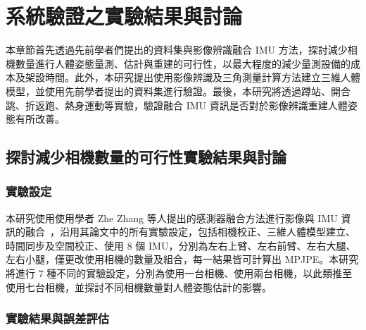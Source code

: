 \chapter{系統驗證之實驗結果與討論}
\fontsize{12pt}{18pt}\selectfont %

本章節首先透過先前學者們提出的資料集與影像辨識融合 IMU 方法，探討減少相機數量進行人體姿態量測、估計與重建的可行性，以最大程度的減少量測設備的成本及架設時間。此外，本研究提出使用影像辨識及三角測量計算方法建立三維人體模型，並使用先前學者提出的資料集進行驗證。最後，本研究將透過蹲站、開合跳、折返跑、熱身運動等實驗，驗證融合 IMU 資訊是否對於影像辨識重建人體姿態有所改善。

\section{探討減少相機數量的可行性實驗結果與討論}
\subsection{實驗設定}
本研究使用使用學者 Zhe Zhang 等人提出的感測器融合方法進行影像與 IMU 資訊的融合~\cite{Zhang_2020_CVPR}，沿用其論文中的所有實驗設定，包括相機校正、三維人體模型建立、時間同步及空間校正、使用 8 個 IMU，分別為左右上臂、左右前臂、左右大腿、左右小腿，僅更改使用相機的數量及組合，每一結果皆可計算出 MPJPE。本研究將進行 7 種不同的實驗設定，分別為使用一台相機、使用兩台相機，以此類推至使用七台相機，並探討不同相機數量對人體姿態估計的影響。

\clearpage

\subsection{實驗結果與誤差評估}
